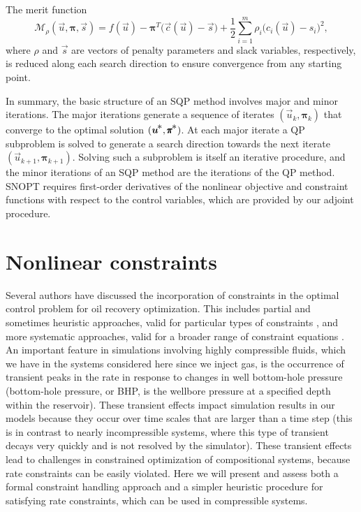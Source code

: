 \documentclass[twocolumn,numbook]{svjour3}          %
\def\u{{\vec u}}
\def\c{{\vec c}}
\def\s{{\vec s}}
\def\bpi{{\pmb{\pi}}}%
\def\half  {{\textstyle{\frac12}}}
\def\kp#1{_{k+#1}}
\def\Mscr{{\mathcal M}}
\def\nthinsp{\mskip -2   mu}
\def\bpistar{\bpi\superstar}
\def\superstar{^{\raise 0.5pt\hbox{$\nthinsp *$}}}
\def\T{^T\!}
\def\ustar{\u\superstar}
\def\SNOPT {{\small SNOPT}}
\begin{document}
The merit function 
\begin{equation}                              \label{eqn-def-merit}
        \Mscr_\rho(\u,\bpi,\s)
          = f(\u) - \bpi\T \bigl( \c(\u) - \s \bigr)
            + \half \sum_{i=1}^m \rho_i\big( c_i(\u) - s_i\big)^2,
\end{equation}
where $\rho$ and $\s$ are vectors of penalty parameters and slack variables, respectively, 
is reduced along each search
direction to ensure convergence from any starting point.

In summary, the basic structure of an SQP method involves major and
minor iterations.  The major iterations generate a sequence of
iterates $(\u_k,\bpi_k)$ that converge to the optimal solution $(\ustar,\bpistar)$.
At each major iterate a QP subproblem is solved to generate a search direction
towards the next iterate $(\u\kp1,\bpi\kp1)$.
Solving such a subproblem is itself an iterative procedure, and the minor iterations of an
SQP method are the iterations of the QP method.
\SNOPT{} requires first-order derivatives of the nonlinear
objective and constraint functions with respect to the control variables, which
are provided by our adjoint procedure.



\section{Nonlinear constraints} \label{sec:constraints} 
Several authors have discussed the incorporation of constraints in the optimal
control problem for oil recovery optimization. This includes partial and sometimes heuristic approaches, valid for particular types of constraints \cite{Brouwer:2004,VanEssen,Virnovski,Wang:2009}, and more systematic approaches, valid for a broader range of constraint equations \cite{Chen:2010,Montleau,Kraaijevanger,Pallav:2008,Suwartadi:2012}. An important feature in simulations involving highly compressible fluids, which we have in the systems considered here since we inject gas, is the occurrence of transient peaks in the rate in response to changes in well bottom-hole pressure (bottom-hole pressure, or BHP, is the wellbore pressure at a specified depth within the reservoir). These transient effects impact simulation results in our models because they occur over time scales that are larger than a time step (this is in contrast to nearly incompressible systems, where this type of transient decays very quickly and is not resolved by the simulator). These transient effects lead to challenges in constrained optimization of compositional systems, because rate constraints can be easily violated. Here we will present and assess both a formal constraint handling approach and a simpler heuristic procedure for satisfying rate constraints, which can be used in compressible systems.
\end{document}

